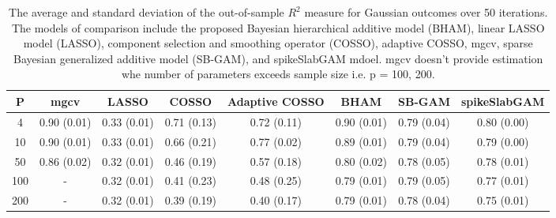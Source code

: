 \begin{table}[ht]
\centering
\begin{tabular}{cccccccc}
  \hline
P & mgcv & LASSO & COSSO & Adaptive COSSO & BHAM & SB-GAM & spikeSlabGAM \\ 
  \hline
  4 & 0.90 (0.01) & 0.33 (0.01) & 0.71 (0.13) & 0.72 (0.11) & 0.90 (0.01) & 0.79 (0.04) & 0.80 (0.00) \\ 
   10 & 0.90 (0.01) & 0.33 (0.01) & 0.66 (0.21) & 0.77 (0.02) & 0.89 (0.01) & 0.79 (0.04) & 0.79 (0.00) \\ 
   50 & 0.86 (0.02) & 0.32 (0.01) & 0.46 (0.19) & 0.57 (0.18) & 0.80 (0.02) & 0.78 (0.05) & 0.78 (0.01) \\ 
  100 & - & 0.32 (0.01) & 0.41 (0.23) & 0.48 (0.25) & 0.79 (0.01) & 0.79 (0.05) & 0.77 (0.01) \\ 
  200 & - & 0.32 (0.01) & 0.39 (0.19) & 0.40 (0.17) & 0.79 (0.01) & 0.78 (0.04) & 0.75 (0.01) \\ 
   \hline
\end{tabular}
\caption{The average and standard deviation of the out-of-sample $R^2$ measure for
    Gaussian outcomes over 50 iterations. The models of comparison include the proposed
    Bayesian hierarchical additive model (BHAM), linear LASSO model (LASSO), component
    selection and smoothing operator (COSSO), adaptive COSSO, mgcv, sparse Bayesian
    generalized additive model (SB-GAM), and spikeSlabGAM mdoel. mgcv doesn't provide estimation
    whe number of parameters exceeds sample size i.e. p = 100, 200.} 
\label{tab:gaus}
\end{table}
